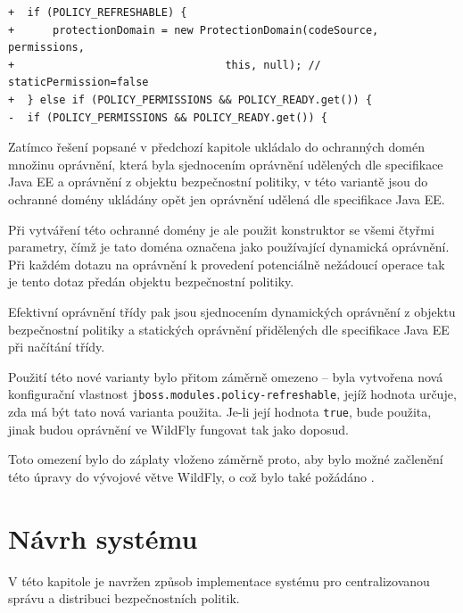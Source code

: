 \begin{lstlisting}[caption=Hlavní část záplaty umožňující nastavit používání dynamických oprávnění, label=refreshable]
+  if (POLICY_REFRESHABLE) {
+      protectionDomain = new ProtectionDomain(codeSource, permissions,
+                                 this, null); // staticPermission=false
+  } else if (POLICY_PERMISSIONS && POLICY_READY.get()) {
-  if (POLICY_PERMISSIONS && POLICY_READY.get()) {
\end{lstlisting}

Zatímco řešení popsané v předchozí kapitole ukládalo do ochranných domén množinu oprávnění,
která byla sjednocením oprávnění udělených dle specifikace Java EE a oprávnění z objektu bezpečnostní politiky,
v této variantě jsou do ochranné domény ukládány opět jen oprávnění udělená dle specifikace Java EE.

Při vytváření této ochranné domény je ale použit konstruktor se všemi čtyřmi parametry, čímž je tato doména označena jako používající dynamická oprávnění.
Při každém dotazu na oprávnění k provedení potenciálně nežádoucí operace tak je tento dotaz předán objektu bezpečnostní politiky.

Efektivní oprávnění třídy pak jsou sjednocením dynamických oprávnění z objektu bezpečnostní politiky a statických oprávnění přidělených dle specifikace Java EE při načítání třídy.

Použití této nové varianty bylo přitom záměrně omezeno -- byla vytvořena nová konfigurační vlastnost {\tt jboss.modules.policy-refreshable},
jejíž hodnota určuje, zda má být tato nová varianta použita. Je-li její hodnota {\tt true}, bude použita,
jinak budou oprávnění ve WildFly fungovat tak jako doposud.

Toto omezení bylo do záplaty vloženo záměrně proto, aby bylo možné začlenění této úpravy do vývojové větve WildFly, o což bylo také požádáno \cite{jmPullRequest}.

\chapter{Návrh systému} \label{navrh}

V této kapitole je navržen způsob implementace systému pro centralizovanou správu a distribuci bezpečnostních politik.

